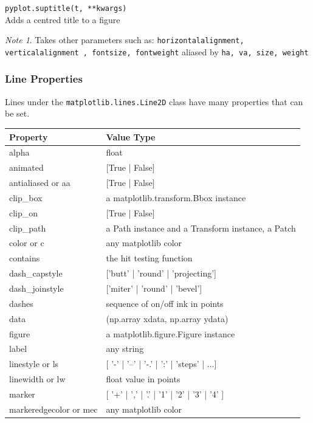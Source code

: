 \documentclass{article}
\theoremstyle{definition}
\theoremstyle{remark}
\newtheorem*{nb}{Note}
\newcommand{\func}[2]{\noindent\lstinline{#1}\\#2}
\begin{document}
\func{pyplot.suptitle(t, **kwargs)}{Adds a centred title to a figure}

\begin{nb}
Takes other parameters such as: \lstinline{horizontalalignment, verticalalignment , fontsize, fontweight} aliased by \lstinline{ha, va, size, weight}
\end{nb}

\subsubsection{Line Properties}

Lines under the \lstinline{matplotlib.lines.Line2D} class have many properties that can be set. 

\begin{table}[h!]
    \centering
    \begin{tabular}{ p{4cm} p{6cm}}
    \hline
    Property 	& 	Value Type \\
    \hline
    alpha 		& 	float \\ 
    animated 	& [True | False] \\
    antialiased or aa &	[True | False] \\
    clip\_box 	& a matplotlib.transform.Bbox instance \\
    clip\_on 	& [True | False] \\
    clip\_path 	& a Path instance and a Transform instance, a Patch \\
    color or c 	&	any matplotlib color \\
    contains 	& the hit testing function \\
    dash\_capstyle 	&	['butt' | 'round' | 'projecting'] \\
    dash\_joinstyle 	&	['miter' | 'round' | 'bevel'] \\
    dashes 		&	sequence of on/off ink in points \\
    data 		&	(np.array xdata, np.array ydata) \\
    figure 		&	a matplotlib.figure.Figure instance \\
    label 		&	any string \\
    linestyle or ls &	[ '-' | '--' | '-.' | ':' | 'steps' | ...] \\
    linewidth or lw &	float value in points \\
    marker 		&	[ '+' | ',' | '.' | '1' | '2' | '3' | '4' ] \\
    markeredgecolor or mec &	any matplotlib color \\

\end{tabular}
\end{table}
\end{document}
